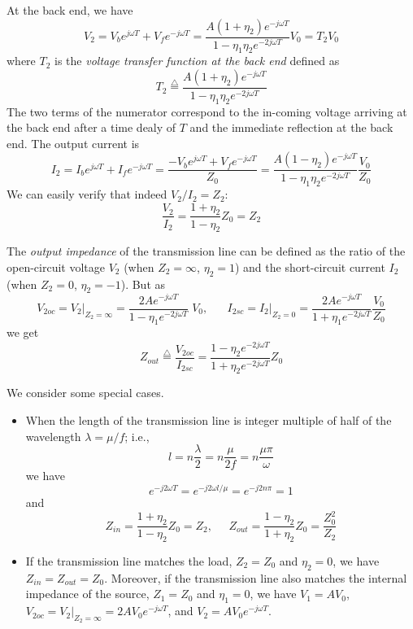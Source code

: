 At the back end, we have
\[  V_2=V_be^{j\omega T}+V_fe^{-j\omega T}
=\frac{A(1+\eta_2)e^{-j\omega T}}{1-\eta_1\eta_2e^{-2j\omega T}}V_0 = T_2V_0 \]
where $T_2$ is the {\em voltage transfer function at the back end} defined as
\[ T_2\stackrel{\triangle}{=}\frac{A(1+\eta_2)e^{-j\omega T}}{1-\eta_1\eta_2e^{-2j\omega T}}	\]
The two terms of the numerator correspond to the in-coming voltage arriving at
the back end after a time dealy of $T$ and the immediate reflection at the back
end. The output current is
\[  I_2=I_be^{j\omega T}+I_fe^{-j\omega T}=\frac{-V_be^{j\omega T}+V_fe^{-j\omega T}}{Z_0}
=\frac{A(1-\eta_2)e^{-j\omega T}}{1-\eta_1\eta_2e^{-2j\omega T}} \frac{V_0}{Z_0}	\]
We can easily verify that indeed $V_2/I_2=Z_2$:
\[ \frac{V_2}{I_2}=\frac{1+\eta_2}{1-\eta_2}Z_0=Z_2 \]

The {\em output impedance} of the transmission line can be defined as the 
ratio of the open-circuit voltage $V_2$ (when $Z_2=\infty$, $\eta_2=1$) and 
the short-circuit current $I_2$ (when $Z_2=0$, $\eta_2=-1$). But as
\[ V_{2oc}=V_2\big|_{Z_2=\infty}=\frac{2Ae^{-j\omega T}}{1-\eta_1e^{-2j\omega T}}\;V_0,\;\;\;\;\;\;
   I_{2sc}=I_2\big|_{Z_2=0}=\frac{2Ae^{-j\omega T}}{1+\eta_1e^{-2j\omega T}}\frac{V_0}{Z_0}
\]
we get
\[ Z_{out}\stackrel{\triangle}{=}\frac{V_{2oc}}{I_{2sc}}
=\frac{1-\eta_2e^{-2j\omega T}}{1+\eta_2e^{-2j\omega T}} Z_0 \]


We consider some special cases.

\begin{itemize}
\item When the length of the transmission line is integer multiple of half of
  the wavelength $\lambda=\mu/f$; i.e.,
  \[ l=n\frac{\lambda}{2}=n\frac{\mu}{2f}=n\frac{\mu\pi}{\omega}  \]
  we have
  \[ e^{-j2\omega T}=e^{-j2\omega l/\mu}=e^{-j2n\pi}=1 \]
  and
  \[ Z_{in}=\frac{1+\eta_2}{1-\eta_2}Z_0=Z_2,\;\;\;\;\;
  Z_{out}=\frac{1-\eta_2}{1+\eta_2}Z_0=\frac{Z_0^2}{Z_2} \]

\item If the transmission line matches the load, $Z_2=Z_0$ and $\eta_2=0$,
  we have $Z_{in}=Z_{out}=Z_0$. Moreover, if the transmission line also matches the
  internal impedance of the source, $Z_1=Z_0$ and $\eta_1=0$, we have $V_1=AV_0$,
  $V_{2oc}=V_2\big|_{Z_2=\infty}=2AV_0 e^{-j\omega T}$, and $V_2=AV_0e^{-j\omega T}$.
\end{itemize}

